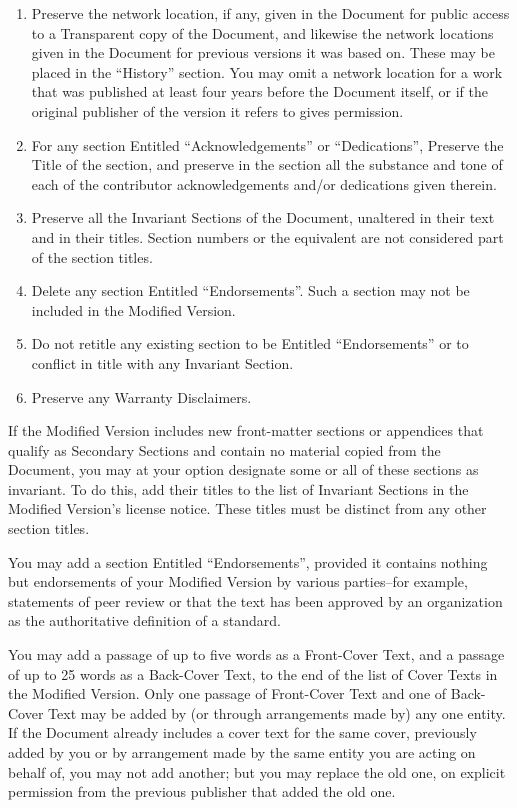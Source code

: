 \documentclass[a4paper,german,10pt,twoside]{book}
\begin{document}
{\begin{appendix}
{\begin{enumerate}
   given on its Title Page, then add an item describing the Modified
   Version as stated in the previous sentence.
\item Preserve the network location, if any, given in the Document for
   public access to a Transparent copy of the Document, and likewise
   the network locations given in the Document for previous versions
   it was based on.	 These may be placed in the ``History'' section.
   You may omit a network location for a work that was published at
   least four years before the Document itself, or if the original
   publisher of the version it refers to gives permission.
\item For any section Entitled ``Acknowledgements'' or ``Dedications'',
   Preserve the Title of the section, and preserve in the section all
   the substance and tone of each of the contributor acknowledgements
   and/or dedications given therein.
\item Preserve all the Invariant Sections of the Document,
   unaltered in their text and in their titles.	 Section numbers
   or the equivalent are not considered part of the section titles.
\item Delete any section Entitled ``Endorsements''.	 Such a section
   may not be included in the Modified Version.
\item Do not retitle any existing section to be Entitled ``Endorsements''
   or to conflict in title with any Invariant Section.
\item Preserve any Warranty Disclaimers.

\end{enumerate}

If the Modified Version includes new front-matter sections or appendices that qualify as Secondary
Sections and contain no material copied from the Document, you may at your option designate some or
all of these sections as invariant.	 To do this, add their titles to the list of Invariant Sections
in the Modified Version's license notice. These titles must be distinct from any other section
titles.

You may add a section Entitled ``Endorsements'', provided it contains nothing but endorsements of
your Modified Version by various parties--for example, statements of peer review or that the text
has been approved by an organization as the authoritative definition of a standard.

You may add a passage of up to five words as a Front-Cover Text, and a passage of up to 25 words as
a Back-Cover Text, to the end of the list of Cover Texts in the Modified Version.  Only one passage
of Front-Cover Text and one of Back-Cover Text may be added by (or through arrangements made by)
any one entity.	 If the Document already includes a cover text for the same cover, previously added
by you or by arrangement made by the same entity you are acting on behalf of, you may not add
another; but you may replace the old one, on explicit permission from the previous publisher that
added the old one.

}
\end{appendix}}
\end{document}
